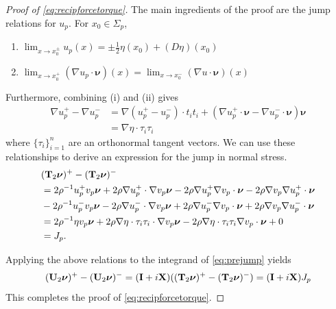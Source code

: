 \documentclass[lineno]{jfm}
\newcommand{\nnu}{\boldsymbol{\nu}}
\begin{document}
\begin{proof}[Proof of \eqref{eq:recipforcetorque}]
  The main ingredients of the proof are the jump relations
  for $u_p$. For $x_0 \in \Sigma_p$,
  \begin{enumerate}
  \item $ \lim_{x \to x_0^\pm } u_p(x) = \pm\frac{1}{2}\eta(x_0) + (D\eta)(x_0)$
  \item $ \lim_{x \to x_0^+ } (\nabla u_p \cdot \nnu) (x) = \lim_{x \to
    x_0^-} (\nabla u \cdot \nnu)(x)$
  \end{enumerate}
  Furthermore,
  combining (i) and (ii) gives
  \begin{align*}
    \nabla u_p^+ - \nabla u_p^-
    &= \nabla (u_p^+ - u_p^-) \cdot t_i t_i +  (\nabla  u_p^+\cdot
    \nnu  - \nabla u_p^- \cdot \nnu) \nnu\\
    &= \nabla \eta \cdot \tau_i \tau_i
  \end{align*}
  where $\{\tau_i\}_{i=1}^n$ are an orthonormal tangent vectors.
  We can use these relationships to derive an expression for the jump in
  normal stress.
  \begin{align*}
    &({\bf T}_2\nnu)^+ - ({\bf T}_2\nnu)^-
    \\
    &= 2\rho^{-1} u_p^+v_p \nnu + 2\rho \nabla u_p^+ \cdot \nabla v_p
    \nnu
    - 2 \rho \nabla u_p^+  \nabla v_p \cdot \nnu
    - 2 \rho \nabla v_p  \nabla u_p^+ \cdot \nnu\\
    &-2\rho^{-1} u_p^-v_p \nnu - 2\rho \nabla u_p^- \cdot \nabla v_p \nnu
    + 2 \rho \nabla u_p^-  \nabla v_p \cdot \nnu
    + 2 \rho \nabla v_p  \nabla u_p^- \cdot \nnu\\
    &= 2\rho^{-1} \eta v_p \nnu + 2\rho \nabla \eta \cdot \tau_i \tau_i
    \cdot \nabla v_p \nnu
    - 2\rho \nabla \eta \cdot \tau_i \tau_i \nabla v_p \cdot \nnu + 0\\
    &= J_p.
  \end{align*}

  Applying the above relations to the integrand of \eqref{eq:prejump} yields
  \[
  ({\bf U}_2\nnu)^+ - ({\bf U}_2\nnu)^-
  =
  ({\bf I} + i {\bf X})(({\bf T}_2\nnu)^+ - ({\bf T}_2\nnu)^-)
  = ({\bf I} + i {\bf X})J_p
  \]
  This completes the proof of \eqref{eq:recipforcetorque}.
\end{proof}




%
\end{document}
